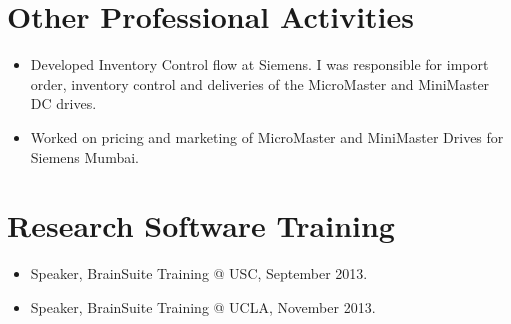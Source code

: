 \documentclass[overlapped,line,letterpaper]{res}
\begin{document}
\begin{resume}
\section{Other Professional Activities}
\begin{itemize} 
    \item Developed Inventory Control flow at Siemens. I was responsible for import order, inventory control and deliveries of the MicroMaster and MiniMaster DC drives.
    \item Worked on pricing and marketing of MicroMaster and MiniMaster Drives for Siemens Mumbai.
\end{itemize}

\section{Research Software Training}
\begin{itemize}
\item  Speaker, BrainSuite Training @ USC, September 2013.
\item Speaker, BrainSuite Training @ UCLA, November 2013.
\end{itemize}






\end{resume}
\end{document}
